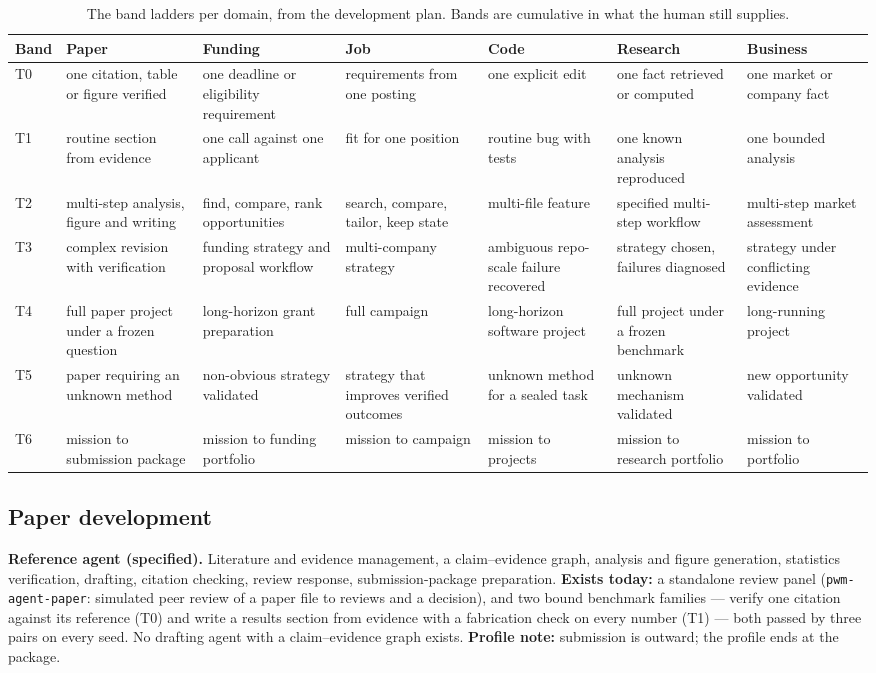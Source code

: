 \documentclass[11pt]{article}
\theoremstyle{definition}
\begin{document}
\begin{table}[!htbp]
\centering\scriptsize
\begin{tabularx}{\textwidth}{@{}lYYYYYY@{}}
\toprule
Band & Paper & Funding & Job & Code & Research & Business \\
\midrule
T0 & one citation, table or figure verified & one deadline or eligibility requirement & requirements from one posting & one explicit edit & one fact retrieved or computed & one market or company fact \\
T1 & routine section from evidence & one call against one applicant & fit for one position & routine bug with tests & one known analysis reproduced & one bounded analysis \\
T2 & multi-step analysis, figure and writing & find, compare, rank opportunities & search, compare, tailor, keep state & multi-file feature & specified multi-step workflow & multi-step market assessment \\
T3 & complex revision with verification & funding strategy and proposal workflow & multi-company strategy & ambiguous repo-scale failure recovered & strategy chosen, failures diagnosed & strategy under conflicting evidence \\
T4 & full paper project under a frozen question & long-horizon grant preparation & full campaign & long-horizon software project & full project under a frozen benchmark & long-running project \\
T5 & paper requiring an unknown method & non-obvious strategy validated & strategy that improves verified outcomes & unknown method for a sealed task & unknown mechanism validated & new opportunity validated \\
T6 & mission to submission package & mission to funding portfolio & mission to campaign & mission to projects & mission to research portfolio & mission to portfolio \\
\bottomrule
\end{tabularx}
\caption{The band ladders per domain, from the development plan. Bands are cumulative in what the human still supplies.}
\label{tab:bands}
\end{table}

\subsection{Paper development}

\textbf{Reference agent (specified).} Literature and evidence management, a claim--evidence graph, analysis and figure generation, statistics verification, drafting, citation checking, review response, submission-package preparation. \textbf{Exists today:} a standalone review panel (\texttt{pwm-agent-paper}: simulated peer review of a paper file to reviews and a decision), and two bound benchmark families --- verify one citation against its reference (T0) and write a results section from evidence with a fabrication check on every number (T1) --- both passed by three pairs on every seed. No drafting agent with a claim--evidence graph exists. \textbf{Profile note:} submission is outward; the profile ends at the package.
\end{document}
